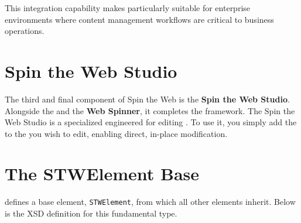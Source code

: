 This integration capability makes \wbdl{} particularly suitable for enterprise environments where content management workflows are critical to business operations.

\section{Spin the Web Studio}
\label{sec:studio}

The third and final component of Spin the Web is the \textbf{Spin the Web Studio}. Alongside the \textbf{\wbdl{}} and the \textbf{Web Spinner}, it completes the framework. The Spin the Web Studio is a specialized \webbaselet{} engineered for editing . To use it, you simply add the \webbaselet{} to the \webbase{} you wish to edit, enabling direct, in-place modification.

\section{The STWElement Base}
\label{sec:stwelement-base}

\wbdl{} defines a base element, \texttt{STWElement}, from which all other elements inherit. Below is the XSD definition for this fundamental type.

